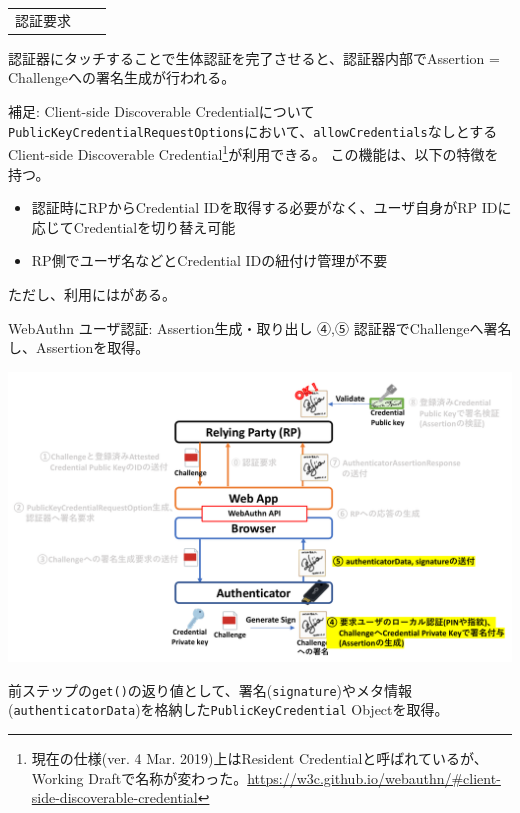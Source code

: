 \documentclass[12pt,dvipdfmx,uplatex]{beamer}
\begin{document}
\begin{frame}[fragile]
\begin{center}
\begin{tabular}{ccc}
\begin{minipage}{0.4\linewidth}
 {\footnotesize 認証要求}
\end{minipage}
\end{tabular}
\end{center}
\end{frame}

\begin{frame}
認証器にタッチすることで生体認証を完了させると、\alert{認証器内部でAssertion = Challengeへの署名生成が行われる。}

\vspace{2ex}

\begin{exampleblock}{\footnotesize 補足: Client-side Discoverable Credentialについて}
\small
\texttt{PublicKeyCredentialRequestOptions}において、\texttt{allowCredentials}なしとするClient-side Discoverable Credential\footnote[frame]{\scriptsize 現在の仕様(ver. 4 Mar. 2019)上はResident Credentialと呼ばれているが、Working Draftで名称が変わった。\url{https://w3c.github.io/webauthn/\#client-side-discoverable-credential}}が利用できる。
この機能は、以下の特徴を持つ。
\begin{itemize}
\item 認証時にRPからCredential IDを取得する必要がなく、ユーザ自身がRP IDに応じてCredentialを切り替え可能
\item RP側でユーザ名などとCredential IDの紐付け管理が不要
\end{itemize}
ただし、利用にはがある。
\end{exampleblock}
\end{frame}


\begin{frame}{WebAuthn ユーザ認証: Assertion生成・取り出し}
\small
④,⑤ 認証器でChallengeへ署名し、Assertionを取得。
\begin{center}
\includegraphics[width=0.9\linewidth]{Figs/webauthn-authentication3.pdf}
\end{center}
前ステップの\texttt{get()}の返り値として、署名(\texttt{signature})やメタ情報(\texttt{authenticatorData})を格納した\texttt{PublicKeyCredential} Objectを取得。
\end{frame}
\end{document}
